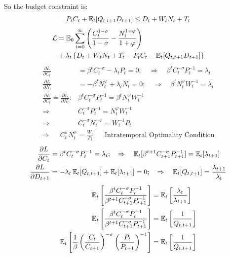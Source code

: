 \documentclass[12pt]{article}
\begin{document}
So the budget constraint is:
\begin{align}
    P_t C_t + \operatorname{\mathbb{E}}_t [Q_{t,t+1}D_{t+1}] \leq D_t + W_t N_t + T_t
\end{align}
\begin{align}
    \mathcal{L} & = \operatorname{\mathbb{E}}_0 \sum^{\infty}_{t=0} \left( \frac{C_t^{1-\sigma}}{1-\sigma} - \frac{N_t^{1+\varphi}}{1+\varphi} \right)  \nonumber \\ &+ \lambda_t\left\{  D_t + W_t N_t + T_t - P_t C_t - \operatorname{\mathbb{E}}_t [Q_{t,t+1}D_{t+1}] \right\}
\end{align}
\begin{align*}
    \frac{\partial L}{\partial C_t}                                    & = \beta^t C_t^{-\sigma} - \lambda_t P_t = 0; \quad \Rightarrow \quad \beta^t C_t^{-\sigma} P_{t}^{-1} = \lambda_t  \\
    \frac{\partial L}{\partial N_t}                                    & = -\beta^t N_t^{\varphi} + \lambda_t N_t = 0; \quad \Rightarrow \quad \beta^t N_t^{\varphi} W_{t}^{-1} = \lambda_t \\
    \frac{\partial L}{\partial C_t} = \frac{\partial L}{\partial N_t}: & \beta^t C_t^{-\sigma} P_{t}^{-1} = \beta^t N_t^{\varphi} W_{t}^{-1}                                                \\
    \Rightarrow                                                        & C_t^{-\sigma} P_{t}^{-1} = N_t^{\varphi} W_{t}^{-1}                                                                \\
    \Rightarrow                                                        & C_t^{-\sigma} N_t^{-\varphi} =  W_{t}^{-1}     P_{t}
\end{align*}
\begin{align}
    \Rightarrow &  & C_t^{\sigma} N_t^{\varphi} =  \frac{W_t}{P_t} \label{eq:intratemporal_optimality_condition} &  & \text{Intratemporal Optimality Condition}
\end{align}
\begin{align*}
    \frac{\partial L}{\partial C_t}     & = \beta^t C_t^{-\sigma} P_{t}^{-1} = \lambda_t; \quad \Rightarrow \quad \operatorname{\mathbb{E}}_t[\beta^{t+1} C_{t+1}^{-\sigma} P_{t+1}^{-1}] = \operatorname{\mathbb{E}}_t[\lambda_{t+1}] \\
    \frac{\partial L}{\partial D_{t+1}} & = -\lambda_t \operatorname{\mathbb{E}}_t[Q_{t,t+1}] + \operatorname{\mathbb{E}}_t[\lambda_{t+1}] = 0; \quad \Rightarrow \quad \operatorname{\mathbb{E}}_t[Q_{t,t+1}] = \frac{\lambda_{t+1}}{\lambda_t}
\end{align*}
\begin{align*}
    \operatorname{\mathbb{E}}_t\left[\frac{\beta^t C_t^{-\sigma} P_{t}^{-1}}{\beta^{t+1} C_{t+1}^{-\sigma} P_{t+1}^{-1}}\right]                 & = \operatorname{\mathbb{E}}_t\left[\frac{\lambda_t}{\lambda_{t+1}}\right] \\
    \operatorname{\mathbb{E}}_t\left[\frac{\beta^t C_t^{-\sigma} P_{t}^{-1}}{\beta^{t+1} C_{t+1}^{-\sigma} P_{t+1}^{-1}}\right]                 & = \operatorname{\mathbb{E}}_t\left[\frac{1}{Q_{t,t+1}}\right]             \\
    \operatorname{\mathbb{E}}_t\left[\frac{1}{\beta} \left(\frac{C_t}{C_{t+1}}\right)^{-\sigma} \left(\frac{P_{t}}{ P_{t+1}}\right)^{-1}\right] & = \operatorname{\mathbb{E}}_t\left[\frac{1}{Q_{t,t+1}}\right]
\end{align*}
\end{document}
